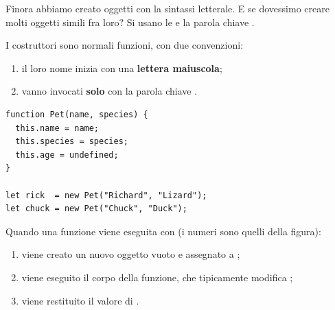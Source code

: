 Finora abbiamo creato oggetti con la sintassi letterale. E se dovessimo creare
molti oggetti simili fra loro? Si usano le  e la
parola chiave .

I costruttori sono normali funzioni, con due convenzioni:

\begin{enumerate}
  \item il loro nome inizia con una \textbf{lettera maiuscola};
  \item vanno invocati \textbf{solo} con la parola chiave .
\end{enumerate}

\begin{affianco}[0.5][c]
\begin{lstlisting}[style=js, name=costruttore.js]
function Pet(name, species) {
  this.name = name;
  this.species = species;
  this.age = undefined;
}

let rick  = new Pet("Richard", "Lizard");
let chuck = new Pet("Chuck", "Duck");
\end{lstlisting}
\risultato
\begin{immagine}
\end{immagine}
\end{affianco}

Quando una funzione viene eseguita con  (i numeri sono quelli della
figura):

\begin{enumerate}
  \item viene creato un nuovo oggetto vuoto e assegnato a ;
  \item viene eseguito il corpo della funzione, che tipicamente modifica
        ;
  \item viene restituito il valore di .
\end{enumerate}

